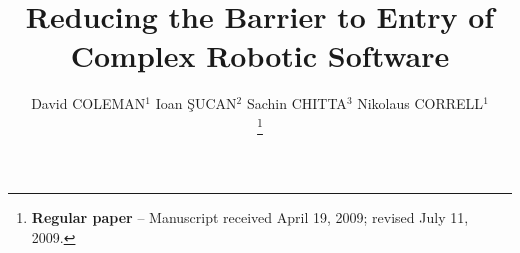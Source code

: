 \documentclass[10pt,journal,compsoc]{joser1}
\begin{document}
\title{Reducing the Barrier to Entry of \\\baselineskip Complex Robotic Software}

\author{
David COLEMAN$^{1}$
\qquad
Ioan \c{S}UCAN$^{2}$
\qquad
Sachin CHITTA$^{3}$
\qquad
Nikolaus CORRELL$^{1}$

\thanks{{\bf Regular paper} -- Manuscript received April 19, 2009;
revised July 11, 2009.}



} %

\address{
$^1$ Dept. of Computer Science, University of Colorado at Boulder, 430 UCB, Boulder, CO 80309\\
$^2$ Willow Garage, Inc., 68 Willow Road, Menlo Park, CA 94025\\
$^3$ SRI International, 333 Ravenswood Avenue, Menlo Park, CA 94025
}


\markboth
\end{document}
